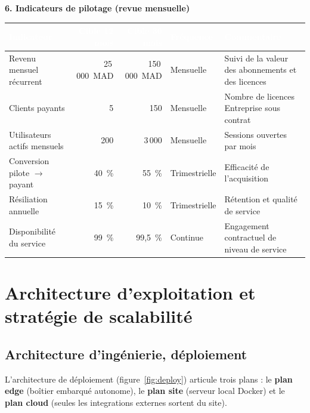 \documentclass[11pt,a4paper]{article}
\begin{document}
\begin{landscape}
\vspace{0.35cm}
\textbf{\color{cwblue}6. Indicateurs de pilotage (revue mensuelle)}
\vspace{0.1cm}
{\footnotesize
\begin{center}
\begin{tabularx}{24.4cm}{>{\raggedright\arraybackslash}p{6.2cm} r r >{\raggedright\arraybackslash}p{4.4cm} >{\raggedright\arraybackslash}X}
\toprule
\rowcolor{cwblue} \textcolor{white}{\bf Indicateur} & \textcolor{white}{\bf Cible 12 mois} &
\textcolor{white}{\bf Cible 36 mois} & \textcolor{white}{\bf Fréquence} & \textcolor{white}{\bf Commentaire} \\
\midrule
Revenu mensuel récurrent & 25\,000~MAD & 150\,000~MAD & Mensuelle & Suivi de la valeur des
  abonnements et des licences \\
Clients payants & 5 & 150 & Mensuelle & Nombre de licences Entreprise sous contrat \\
Utilisateurs actifs mensuels & 200 & 3\,000 & Mensuelle & Sessions ouvertes par mois \\
Conversion pilote $\rightarrow$ payant & 40~\% & 55~\% & Trimestrielle & Efficacité de l'acquisition \\
Résiliation annuelle & 15~\% & 10~\% & Trimestrielle & Rétention et qualité de service \\
Disponibilité du service & 99~\% & 99,5~\% & Continue & Engagement contractuel de niveau de service \\
\bottomrule
\end{tabularx}
\end{center}}
\end{landscape}



\section{Architecture d'exploitation et stratégie de scalabilité}
\label{sec:explo}

\subsection{Architecture d'ingénierie, déploiement}
\label{sec:deploiement}
L'architecture de déploiement (figure~\ref{fig:deploy}) articule trois plans : le \textbf{plan edge}
(boîtier embarqué autonome), le \textbf{plan site} (serveur local Docker) et le \textbf{plan cloud}
(seules les integrations externes sortent du site).
\end{document}
